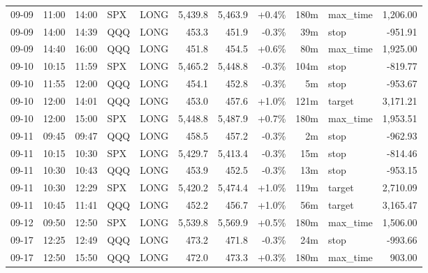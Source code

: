\documentclass[11pt,a4paper,twoside]{article}
\begin{document}
\begin{center}
\begin{longtable}{>{\color{txtmain}}l l l l l r r r r >{\color{txtmain}}l r}
09-09 & 11:00 & 14:00 & SPX & LONG & 5,439.8 & 5,463.9 & \textcolor{wingreen}{+0.4\%} & 180m & max\_time & \textcolor{wingreen}{1,206.00} \\
09-09 & 14:00 & 14:39 & QQQ & LONG & 453.3 & 451.9 & \textcolor{lossred}{-0.3\%} & 39m & stop & \textcolor{lossred}{-951.91} \\
09-09 & 14:40 & 16:00 & QQQ & LONG & 451.8 & 454.5 & \textcolor{wingreen}{+0.6\%} & 80m & max\_time & \textcolor{wingreen}{1,925.00} \\
09-10 & 10:15 & 11:59 & SPX & LONG & 5,465.2 & 5,448.8 & \textcolor{lossred}{-0.3\%} & 104m & stop & \textcolor{lossred}{-819.77} \\
09-10 & 11:55 & 12:00 & QQQ & LONG & 454.1 & 452.8 & \textcolor{lossred}{-0.3\%} & 5m & stop & \textcolor{lossred}{-953.67} \\
09-10 & 12:00 & 14:01 & QQQ & LONG & 453.0 & 457.6 & \textcolor{wingreen}{+1.0\%} & 121m & target & \textcolor{wingreen}{3,171.21} \\
09-10 & 12:00 & 15:00 & SPX & LONG & 5,448.8 & 5,487.9 & \textcolor{wingreen}{+0.7\%} & 180m & max\_time & \textcolor{wingreen}{1,953.51} \\
09-11 & 09:45 & 09:47 & QQQ & LONG & 458.5 & 457.2 & \textcolor{lossred}{-0.3\%} & 2m & stop & \textcolor{lossred}{-962.93} \\
09-11 & 10:15 & 10:30 & SPX & LONG & 5,429.7 & 5,413.4 & \textcolor{lossred}{-0.3\%} & 15m & stop & \textcolor{lossred}{-814.46} \\
09-11 & 10:30 & 10:43 & QQQ & LONG & 453.9 & 452.5 & \textcolor{lossred}{-0.3\%} & 13m & stop & \textcolor{lossred}{-953.15} \\
09-11 & 10:30 & 12:29 & SPX & LONG & 5,420.2 & 5,474.4 & \textcolor{wingreen}{+1.0\%} & 119m & target & \textcolor{wingreen}{2,710.09} \\
09-11 & 10:45 & 11:41 & QQQ & LONG & 452.2 & 456.7 & \textcolor{wingreen}{+1.0\%} & 56m & target & \textcolor{wingreen}{3,165.47} \\
09-12 & 09:50 & 12:50 & SPX & LONG & 5,539.8 & 5,569.9 & \textcolor{wingreen}{+0.5\%} & 180m & max\_time & \textcolor{wingreen}{1,506.00} \\
09-17 & 12:25 & 12:49 & QQQ & LONG & 473.2 & 471.8 & \textcolor{lossred}{-0.3\%} & 24m & stop & \textcolor{lossred}{-993.66} \\
09-17 & 12:50 & 15:50 & QQQ & LONG & 472.0 & 473.3 & \textcolor{wingreen}{+0.3\%} & 180m & max\_time & \textcolor{wingreen}{903.00} \\

\end{longtable}
\end{center}
\end{document}
